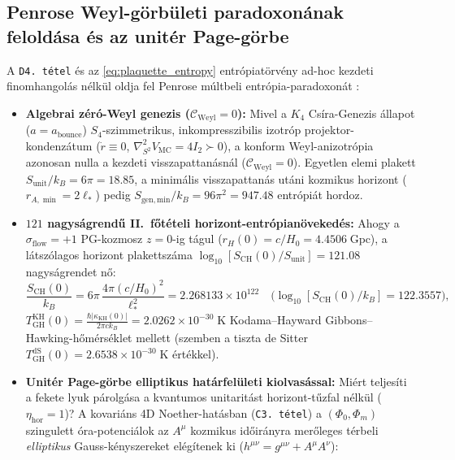 \documentclass[11pt,a4paper]{article}
\theoremstyle{remark}
\begin{document}
\subsection{Penrose Weyl-g\"orb\"uleti paradoxon\'anak felold\'asa \'es az unit\'er Page-g\"orbe}

A \texttt{D4.\ t\'etel} \'es az \eqref{eq:plaquette_entropy} entr\'opiat\"orv\'eny ad-hoc kezdeti finomhangol\'as n\'elk\"ul oldja fel Penrose m\'ultbeli entr\'opia-paradoxon\'at \cite{Penrose1979Weyl}:
\begin{itemize}
  \item \textbf{Algebrai z\'er\'o-Weyl genezis ($\mathcal{C}_{\mathrm{Weyl}} = 0$):} Mivel a $K_4$ Cs\'ira-Genezis \'allapot ($a = a_{\mathrm{bounce}}$) $S_4$-szimmetrikus, inkompresszibilis izotr\'op projektor-kondenz\'atum ($\dot{r} \equiv 0$, $\nabla^2_{S^2} V_{\mathrm{MC}} = 4I_2 \succ 0$), a konform Weyl-anizotr\'opia azonosan nulla a kezdeti visszapattan\'asn\'al ($\mathcal{C}_{\mathrm{Weyl}} = 0$). Egyetlen elemi plakett $S_{\mathrm{unit}}/k_B = 6\pi = 18.85$, a minim\'alis visszapattan\'as ut\'ani kozmikus horizont ($r_{A,\min} = 2\ell_*$) pedig $S_{\mathrm{gen,min}}/k_B = 96\pi^2 = 947.48$ entr\'opi\'at hordoz.
  \item \textbf{$121$ nagys\'agrend\H{u} II.\ f\H{o}t\'eteli horizont-entr\'opian\"oveked\'es:} Ahogy a $\sigma_{\mathrm{flow}} = +1$ PG-kozmosz $z = 0$-ig t\'agul ($r_H(0) = c/H_0 = 4.4506\;\mathrm{Gpc}$), a l\'atsz\'olagos horizont plakettsz\'ama $\log_{10}[S_{\mathrm{CH}}(0)/S_{\mathrm{unit}}] = 121.08$ nagys\'agrendet n\H{o}:
  \begin{equation}
    \frac{S_{\mathrm{CH}}(0)}{k_B} = 6\pi\,\frac{4\pi(c/H_0)^2}{\ell_*^2} = 2.268133 \times 10^{122} \quad \bigl(\log_{10}[S_{\mathrm{CH}}(0)/k_B] = 122.3557\bigr),
    \label{eq:s_ch_z0}
  \end{equation}
  $T_{\mathrm{GH}}^{\mathrm{KH}}(0) = \frac{\hbar|\kappa_{\mathrm{KH}}(0)|}{2\pi c k_B} = 2.0262 \times 10^{-30}\;\mathrm{K}$ Kodama--Hayward Gibbons--Hawking-h\H{o}m\'ers\'eklet mellett (szemben a tiszta de Sitter $T_{\mathrm{GH}}^{\mathrm{dS}}(0) = 2.6538 \times 10^{-30}\;\mathrm{K}$ \'ert\'ekkel).
  \item \textbf{Unit\'er Page-g\"orbe elliptikus hat\'arfel\"uleti kiolvas\'assal:} Mi\'ert teljes\'iti a fekete lyuk p\'arolg\'asa a kvantumos unitarit\'ast \cite{Page1993} horizont-t\H{u}zfal n\'elk\"ul ($\eta_{\mathrm{hor}} = 1$)? A kovari\'ans 4D Noether-hat\'asban (\texttt{C3.\ t\'etel}) \cite{JolcsakTauFoundationSeries2026} a $(\Phi_0, \Phi_m)$ szingulett \'ora-potenci\'alok az $A^\mu$ kozmikus id\H{o}ir\'anyra mer\H{o}leges t\'erbeli \emph{elliptikus} Gauss-k\'enyszereket el\'eg\'itenek ki ($h^{\mu\nu} = g^{\mu\nu} + A^\mu A^\nu$):

\end{itemize}
\end{document}
